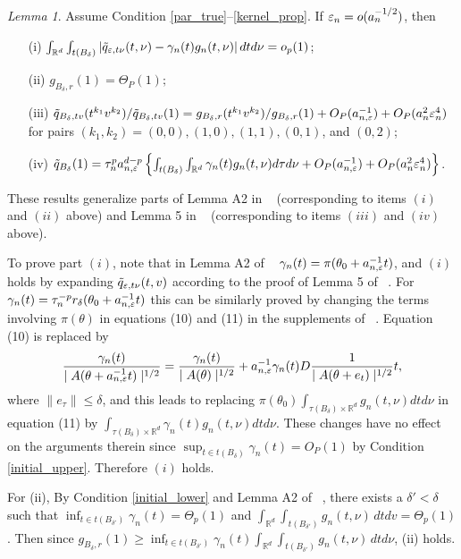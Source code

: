 \documentclass[9pt]{article}
\theoremstyle{remark}
\newtheorem{lemma}{Lemma}
\begin{document}
\begin{lemma}\label{Alemma2} Assume Condition \ref{par_true}--\ref{kernel_prop}. If $\varepsilon_{n}=o(a_{n}^{-1/2})$, then 
	\begin{enumerate}
		\item[(i)] $\int_{\mathbb{R}^{d}}\int_{t(B_{\delta})}|\tilde{q}_{\varepsilon,t\nu}(t,\nu)-\gamma_{n}(t)g_{n}(t,\nu)|\,dtd\nu=o_{p}(1)$;
		\item[(ii)] $g_{B_{\delta},r}(1)=\Theta_{P}(1);$ 
		\item[(iii)] $\tilde{q}_{B_{\delta},tv}(t^{k_{1}}v^{k_{2}})/\tilde{q}_{B_{\delta},tv}(1)=g_{B_{\delta},r}(t^{k_{1}}v^{k_{2}})/g_{B_{\delta},r}(1)+O_{P}(a_{n,\varepsilon}^{-1})+O_{P}(a_{n}^{2}\varepsilon_{n}^{4})$
		for pairs $(k_{1}, k_{2}) = (0,0), (1,0), (1,1), (0,1)$, and $(0,2)$; 
		\item[(iv)] $\tilde{q}_{B_{\delta}}(1)=\tau_{n}^{p}a_{n,\varepsilon}^{d-p}\left\{ \int_{t(B_{\delta})}\int_{\mathbb{R}^{d}}\gamma_{n}(t)g_{n}(t,\nu)d\tau d\nu+O_{P}(a_{n,\varepsilon}^{-1})+O_{P}(a_{n}^{2}\varepsilon_{n}^{4})\right\} $. 
	\end{enumerate}\end{lemma}
	These results generalize parts of Lemma A2 in ~\cite{Li2017} (corresponding to items $(i)$ and $(ii)$ above) and Lemma 5 in
	~\cite{Li2016} (corresponding to items $(iii)$ and $(iv)$ above). 
	
	To prove part $(i)$, note that in Lemma A2 of ~\cite{Li2017}  $\gamma_{n}(t)=\pi(\theta_0+a_{n,\varepsilon}^{-1}t)$,
	and $(i)$ holds by expanding $\tilde{q}_{\varepsilon,t\nu}(t,v)$ according to
	the proof of Lemma 5 of ~\cite{Li2016}. 
	For $\gamma_{n}(t)=\tau_{n}^{-p}r_{\delta}(\theta_0+a_{n,\varepsilon}^{-1}t)$ this can be similarly proved by changing the terms involving $\pi(\theta)$ in equations (10) and (11) in the supplements of ~\cite{Li2016}. Equation (10)
	is replaced by 
	\[
	\frac{\gamma_{n}(t)}{\mid A(\theta+a_{n,\varepsilon}^{-1}t)\mid^{1/2}}=\frac{\gamma_{n}(t)}{\mid A(\theta)\mid^{1/2}}+a_{n,\varepsilon}^{-1}\gamma_{n}(t)D\frac{1}{\mid A(\theta+e_{t})\mid^{1/2}}t,
	\]
	where $\|e_{\tau}\|\leq\delta$, and this leads to replacing $\pi(\theta_0)\int_{\tau(B_{\delta})\times\mathbb{R}^{d}}g_{n}(t,\nu)dtd\nu$
	in equation (11) by $\int_{\tau(B_{\delta})\times\mathbb{R}^{d}}\gamma_{n}(t)g_{n}(t,\nu)dtd\nu$.
	These changes have no effect on the arguments therein since $\sup_{t\in t(B_{\delta})}\gamma_{n}(t)=O_{P}(1)$
	by Condition \ref{initial_upper}. Therefore $(i)$ holds.
	
	For (ii), By Condition \ref{initial_lower} and Lemma A2 of ~\cite{Li2017}, there exists a $\delta'<\delta$
	such that $\inf_{t\in t(B_{\delta'})}\gamma_{n}(t)=\Theta_{p}(1)$
	and $\int_{\mathbb{R}^{d}}\int_{t(B_{\delta'})}g_{n}(t,\nu)\,dtdv=\Theta_{p}(1)$.
	Then since $g_{B_{\delta},r}(1)\geq\inf_{t\in t(B_{\delta'})}\gamma_{n}(t)\int_{\mathbb{R}^{d}}\int_{t(B_{\delta'})}g_{n}(t,\nu)\,dtd\nu$,
	(ii) holds.
	
\end{document}
